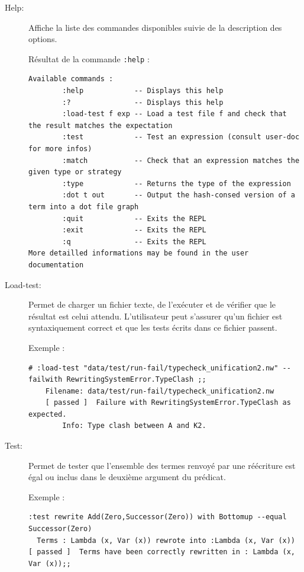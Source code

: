 \documentclass[12pt,a4paper]{article}
\begin{document}
\begin{description}

\item[Help:]
Affiche la liste des commandes disponibles suivie de la description des options.

\begin{minipage}{\textwidth}
Résultat de la commande \verb=:help= :
\begin{lstlisting}[breaklines=true,basicstyle=\ttfamily\footnotesize]
Available commands :
        :help            -- Displays this help
        :?               -- Displays this help
        :load-test f exp -- Load a test file f and check that the result matches the expectation
        :test            -- Test an expression (consult user-doc for more infos)
        :match           -- Check that an expression matches the given type or strategy
        :type            -- Returns the type of the expression
        :dot t out       -- Output the hash-consed version of a term into a dot file graph
        :quit            -- Exits the REPL
        :exit            -- Exits the REPL
        :q               -- Exits the REPL
More detailled informations may be found in the user documentation
\end{lstlisting}
\end{minipage}

\item[Load-test:]
Permet de charger un fichier texte, de l'exécuter et de vérifier que le résultat est celui attendu. L'utilisateur peut s'assurer qu'un fichier est syntaxiquement correct et que les tests écrits dans ce fichier passent.

\begin{minipage}{\textwidth}
Exemple :
\begin{lstlisting}[breaklines=true,basicstyle=\ttfamily\footnotesize]
  # :load-test "data/test/run-fail/typecheck_unification2.nw" --failwith RewritingSystemError.TypeClash ;;
    Filename: data/test/run-fail/typecheck_unification2.nw
    [ passed ]  Failure with RewritingSystemError.TypeClash as expected.
        Info: Type clash between A and K2.
\end{lstlisting}
\end{minipage}

\item[Test:]
Permet de tester que l'ensemble des termes renvoyé par une réécriture est égal ou inclus dans le deuxième argument du prédicat.\\

 \begin{minipage}{\textwidth}
Exemple :
\begin{lstlisting}[breaklines=true,basicstyle=\ttfamily\footnotesize]
  :test rewrite Add(Zero,Successor(Zero)) with Bottomup --equal Successor(Zero)
  Terms : Lambda (x, Var (x)) rewrote into :Lambda (x, Var (x))
[ passed ]  Terms have been correctly rewritten in : Lambda (x, Var (x));;
\end{lstlisting}
\end{minipage}


\end{description}
\end{document}

